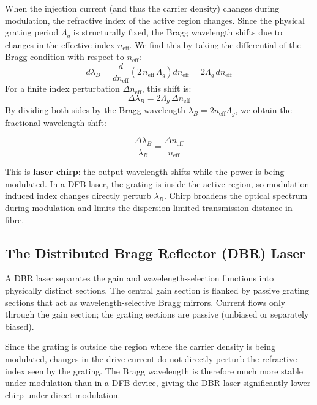 When the injection current (and thus the carrier density) changes during modulation, the refractive index of the active region changes. Since the physical grating period $\Lambda_g$ is structurally fixed, the Bragg wavelength shifts due to changes in the effective index $n_\text{eff}$. We find this by taking the differential of the Bragg condition with respect to $n_\text{eff}$:
\begin{equation*}
    d\lambda_B = \frac{d}{d n_\text{eff}}\left(2\,n_\text{eff}\,\Lambda_g\right) dn_\text{eff} = 2\Lambda_g\,dn_\text{eff}
\end{equation*}
For a finite index perturbation $\Delta n_\text{eff}$, this shift is:
\begin{equation*}
    \Delta\lambda_B = 2\Lambda_g\,\Delta n_\text{eff}
\end{equation*}
By dividing both sides by the Bragg wavelength $\lambda_B = 2 n_\text{eff} \Lambda_g$, we obtain the fractional wavelength shift:
\begin{keyresult}
    \begin{equation}
        \frac{\Delta\lambda_B}{\lambda_B} = \frac{\Delta n_\text{eff}}{n_\text{eff}}
    \end{equation}
\end{keyresult}

This is \textbf{laser chirp}: the output wavelength shifts while the power is being modulated. In a DFB laser, the grating is inside the active region, so modulation-induced index changes directly perturb $\lambda_B$. Chirp broadens the optical spectrum during modulation and limits the dispersion-limited transmission distance in fibre.

\subsection{The Distributed Bragg Reflector (DBR) Laser}

A DBR laser separates the gain and wavelength-selection functions into physically distinct sections. The central gain section is flanked by passive grating sections that act as wavelength-selective Bragg mirrors. Current flows only through the gain section; the grating sections are passive (unbiased or separately biased).

Since the grating is outside the region where the carrier density is being modulated, changes in the drive current do not directly perturb the refractive index seen by the grating. The Bragg wavelength is therefore much more stable under modulation than in a DFB device, giving the DBR laser significantly lower chirp under direct modulation.

